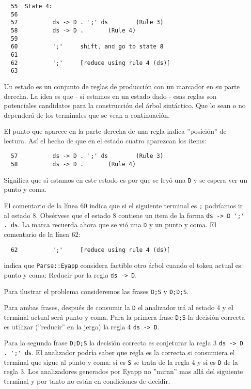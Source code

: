 \begin{verbatim}
  55  State 4:
  56
  57          ds -> D . ';' ds        (Rule 3)
  58          ds -> D .       (Rule 4)
  59
  60          ';'     shift, and go to state 8
  61
  62          ';'     [reduce using rule 4 (ds)]
  63
\end{verbatim}

Un estado es un conjunto de reglas de producción 
con un marcador en su parte derecha.
La idea es que - si estamos en un estado dado -
esas reglas son potenciales candidatos para la construcción
del árbol sintáctico. Que lo sean o no dependerá de los
terminales que se vean a continuación.

El punto que aparece en la parte derecha de una regla
indica ''posición'' de lectura. Así el hecho de que
en el estado cuatro aparezcan los items:

\begin{verbatim}
  57          ds -> D . ';' ds        (Rule 3)
  58          ds -> D .       (Rule 4)
\end{verbatim}

Significa que si estamos en este estado es por que se leyó
una \verb|D| y se espera ver un punto y 
coma. 

El comentario de la línea 60 indica que si el siguiente terminal es \verb|;|
podríamos ir  al estado 8. Obsérvese que el estado 8 contiene un item 
de la forma \verb|ds -> D ';' . ds|. La marca recuerda ahora que se vió 
una \verb|D| y un punto y coma.
El comentario de la línea 62:

\begin{verbatim}
  62          ';'     [reduce using rule 4 (ds)]
\end{verbatim}
indica que \verb|Parse::Eyapp| considera factible otro árbol cuando el token
actual es punto y coma: 
Reducir por la regla \verb|ds -> D|.

Para ilustrar el problema consideremos las frases
\verb|D;S| y \verb|D;D;S|. 

Para ambas frases,
después de consumir la \verb|D| el
analizador irá al estado 4 y el terminal actual será punto y coma.
Para la primera frase \verb|D;S| la decisión correcta 
es utilizar (''reducir'' en la jerga) la regla 4 \verb|ds -> D|.

Para la segunda frase \verb|D;D;S| la decisión correcta
es conjeturar la regla 3 \verb|ds -> D . ';' ds|.
El analizador podría saber que regla es la correcta si consumiera 
el terminal que sigue al punto y coma: si es \verb|S| se trata 
de la regla 4 y si es \verb|D| de la regla 3. Los analizadores generados 
por Eyapp no ''miran'' mas allá del siguiente terminal y por tanto
no están en condiciones de decidir.
 
